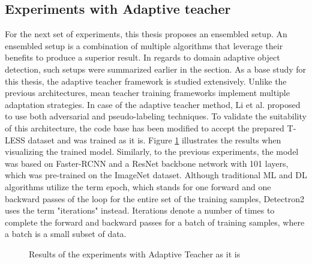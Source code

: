 \subsection{Experiments with Adaptive teacher}
\label{ensemExp} 
For the next set of experiments, this thesis proposes an ensembled setup. An ensembled setup is a combination of multiple algorithms that leverage their benefits to produce a superior result. In regards to domain adaptive object detection, such setups were summarized earlier in the  section. As a base study for this thesis, the adaptive teacher \cite{Li2021}  framework is studied extensively. Unlike the  previous architectures, mean teacher training frameworks implement multiple adaptation strategies. In case of the adaptive teacher method, Li et al. proposed to use both adversarial and pseudo-labeling techniques. To validate the suitability of this architecture, the code base has been modified to accept the prepared T-LESS dataset and was trained as it is. Figure \ref{adapt_experiment1} illustrates the results when visualizing the trained model. Similarly, to the previous experiments, the model was based on Faster-RCNN \cite{ima} and a ResNet \cite{He2015} backbone network with 101 layers, which was pre-trained on the ImageNet  \cite{Russakovsky2014} dataset. Although traditional ML and DL algorithms utilize the term epoch, which stands for one forward and one backward passes of the loop for the entire set of the training samples, Detectron2 \cite{wu2019Detectron2} uses the term "iterations" instead. Iterations denote a number of times to complete the forward and backward passes for a batch of training samples, where a batch is a small subset of data. 

\begin{figure}[htb]
    \centering
    \qquad
    \caption{Results of the experiments with Adaptive Teacher as it is}\label{adapt_experiment1}%
\end{figure}
\FloatBarrier

